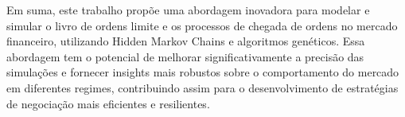 \begin{btUnit}
Em suma, este trabalho propõe uma abordagem inovadora para modelar e simular o livro de ordens limite e os processos de chegada de ordens no mercado financeiro, utilizando Hidden Markov Chains e algoritmos genéticos. Essa abordagem tem o potencial de melhorar significativamente a precisão das simulações e fornecer insights mais robustos sobre o comportamento do mercado em diferentes regimes, contribuindo assim para o desenvolvimento de estratégias de negociação mais eficientes e resilientes.


\end{btUnit}
